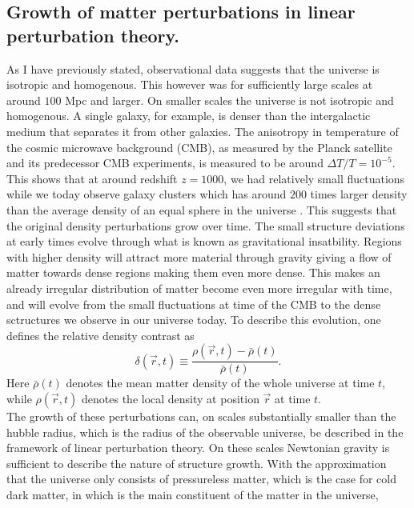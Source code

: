 \subsection{Growth of matter perturbations in linear perturbation theory.}\label{sec:linpert}
As I have previously stated, observational data suggests that the universe is isotropic and homogenous. This
however was for sufficiently large scales at around $100$ Mpc and larger. On
smaller scales the universe is not isotropic and homogenous. A single galaxy,
for example, is denser than the intergalactic medium that separates it from other
galaxies. The anisotropy in temperature of the cosmic microwave background (CMB), as measured by
the Planck satellite and its predecessor CMB experiments, is measured to be
around $\Delta T/T=10^{-5}$. This shows that at around redshift $z=1000$, we had
relatively small fluctuations while we today observe galaxy clusters which has around
$200$ times larger density than the average density of an equal sphere in the
universe \cite[p.~342]{schneider2006extragalactic}. This suggests that the original density
perturbations grow over time. The small structure deviations at early times evolve through what is known as gravitational insatbility.
Regions with higher density will attract more material through gravity giving a flow of matter towards dense regions making them even more dense.
This makes an already irregular distribution of matter become even more irregular with time, and will evolve from the small fluctuations at time of the CMB
to the dense sctructures we observe in our universe today.
To describe this evolution, one defines the relative density
contrast as
\begin{equation}\label{eq:overdensity}
    \delta(\vec{r}, t) \equiv \frac{\rho(\vec{r}, t) - \bar{\rho}(t)}{\bar{\rho}(t)}.
\end{equation}
Here $\bar{\rho}(t)$ denotes the mean matter density of the whole universe at
time $t$, while $\rho(\vec{r}, t)$ denotes the local density at position
$\vec{r}$ at time $t$.\\\indent
The growth of these perturbations can, on scales substantially smaller than the
hubble radius, which is the radius of the observable universe, be described in
the framework of linear perturbation theory. On these scales Newtonian gravity
is sufficient to describe the nature of structure growth. With the approximation
that the universe only consists of pressureless matter, which is the case for
cold dark matter, in which is the main constituent of the matter in the universe, 
